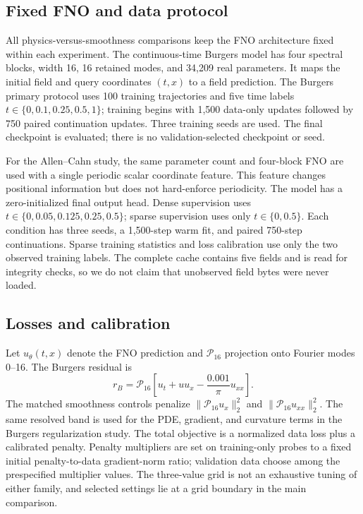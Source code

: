 \documentclass[a4paper,fleqn]{cas-sc}
\begin{document}
\subsection{Fixed FNO and data protocol}
All physics-versus-smoothness comparisons keep the FNO architecture fixed within each experiment. The continuous-time Burgers model has four spectral blocks, width 16, 16 retained modes, and 34,209 real parameters. It maps the initial field and query coordinates $(t,x)$ to a field prediction. The Burgers primary protocol uses 100 training trajectories and five time labels $t\in\{0,0.1,0.25,0.5,1\}$; training begins with 1,500 data-only updates followed by 750 paired continuation updates. Three training seeds are used. The final checkpoint is evaluated; there is no validation-selected checkpoint or seed.

For the Allen--Cahn study, the same parameter count and four-block FNO are used with a single periodic scalar coordinate feature. This feature changes positional information but does not hard-enforce periodicity. The model has a zero-initialized final output head. Dense supervision uses $t\in\{0,0.05,0.125,0.25,0.5\}$; sparse supervision uses only $t\in\{0,0.5\}$. Each condition has three seeds, a 1,500-step warm fit, and paired 750-step continuations. Sparse training statistics and loss calibration use only the two observed training labels. The complete cache contains five fields and is read for integrity checks, so we do not claim that unobserved field bytes were never loaded.

\subsection{Losses and calibration}
Let $u_\theta(t,x)$ denote the FNO prediction and $\mathcal{P}_{16}$ projection onto Fourier modes 0--16. The Burgers residual is
\begin{equation}
  r_B = \mathcal{P}_{16}\left[u_t + u u_x - \frac{0.001}{\pi}u_{xx}\right].
  \label{eq:burgers-residual}
\end{equation}
The matched smoothness controls penalize $\|\mathcal{P}_{16}u_x\|_2^2$ and $\|\mathcal{P}_{16}u_{xx}\|_2^2$. The same resolved band is used for the PDE, gradient, and curvature terms in the Burgers regularization study. The total objective is a normalized data loss plus a calibrated penalty. Penalty multipliers are set on training-only probes to a fixed initial penalty-to-data gradient-norm ratio; validation data choose among the prespecified multiplier values. The three-value grid is not an exhaustive tuning of either family, and selected settings lie at a grid boundary in the main comparison.
\end{document}
